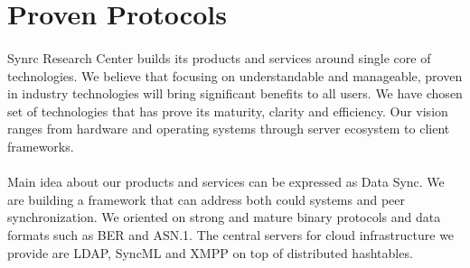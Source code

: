 \documentclass[11pt]{article}
\begin{document}

\section*{Proven Protocols}
\paragraph{}
Synrc Research Center builds its products and services around single core of technologies.
We believe that focusing on understandable and manageable, proven in industry technologies
will bring significant benefits to all users. We have chosen set of technologies that
has prove its maturity, clarity and efficiency. Our vision ranges from hardware and operating systems through
server ecosystem to client frameworks.
\paragraph{}
Main idea about our products and services can be expressed as Data Sync. We are building a framework
that can address both could systems and peer synchronization. We oriented on strong and mature
binary protocols and data formats such as BER and ASN.1. The central servers for cloud infrastructure
we provide are LDAP, SyncML and XMPP on top of distributed hashtables.

\end{document}
